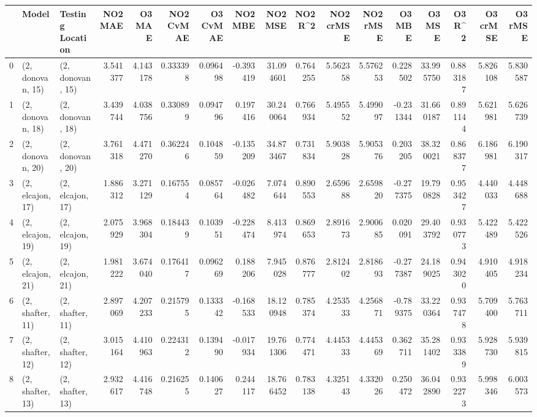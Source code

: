 \begin{tabular}{lllrrrrrrrrrrrrrr}
\toprule
{} &             Model &  Testing Location &   NO2 MAE &    O3 MAE &  NO2 CvMAE &  O3 CvMAE &   NO2 MBE &    NO2 MSE &   NO2 R\textasciicircum2 &  NO2 crMSE &  NO2 rMSE &    O3 MBE &     O3 MSE &    O3 R\textasciicircum2 &  O3 crMSE &   O3 rMSE \\
\midrule
0  &  (2, donovan, 15) &  (2, donovan, 15) &  3.541377 &  4.143178 &   0.333398 &  0.096498 & -0.393419 &  31.094601 &  0.764255 &   5.562358 &  5.576253 &  0.228502 &  33.995750 &  0.883187 &  5.826108 &  5.830587 \\
1  &  (2, donovan, 18) &  (2, donovan, 18) &  3.439744 &  4.038756 &   0.330899 &  0.094796 &  0.197416 &  30.240064 &  0.766934 &   5.495552 &  5.499097 & -0.231344 &  31.660187 &  0.891144 &  5.621981 &  5.626739 \\
2  &  (2, donovan, 20) &  (2, donovan, 20) &  3.761318 &  4.471270 &   0.362246 &  0.104859 & -0.135209 &  34.873467 &  0.731834 &   5.903828 &  5.905376 &  0.203205 &  38.320021 &  0.868377 &  6.186981 &  6.190317 \\
3  &  (2, elcajon, 17) &  (2, elcajon, 17) &  1.886312 &  3.271129 &   0.167554 &  0.085764 & -0.026482 &   7.074644 &  0.890553 &   2.659688 &  2.659820 & -0.277375 &  19.790828 &  0.953427 &  4.440033 &  4.448688 \\
4  &  (2, elcajon, 19) &  (2, elcajon, 19) &  2.075929 &  3.968304 &   0.184439 &  0.103951 & -0.228474 &   8.413974 &  0.869653 &   2.891673 &  2.900685 &  0.020091 &  29.403792 &  0.930773 &  5.422489 &  5.422526 \\
5  &  (2, elcajon, 21) &  (2, elcajon, 21) &  1.981222 &  3.674040 &   0.176417 &  0.096269 &  0.188206 &   7.945028 &  0.876777 &   2.812402 &  2.818693 & -0.277387 &  24.189025 &  0.943020 &  4.910405 &  4.918234 \\
6  &  (2, shafter, 11) &  (2, shafter, 11) &  2.897069 &  4.207233 &   0.215795 &  0.133342 & -0.168533 &  18.120948 &  0.785374 &   4.253533 &  4.256871 & -0.789375 &  33.220364 &  0.937478 &  5.709400 &  5.763711 \\
7  &  (2, shafter, 12) &  (2, shafter, 12) &  3.015164 &  4.410963 &   0.224312 &  0.139490 & -0.017934 &  19.761306 &  0.774471 &   4.445333 &  4.445369 &  0.362711 &  35.281402 &  0.933389 &  5.928730 &  5.939815 \\
8  &  (2, shafter, 13) &  (2, shafter, 13) &  2.932617 &  4.416748 &   0.216255 &  0.140627 &  0.244117 &  18.766452 &  0.783138 &   4.325143 &  4.332026 &  0.250472 &  36.042890 &  0.932273 &  5.998346 &  6.003573 \\

\end{tabular}
